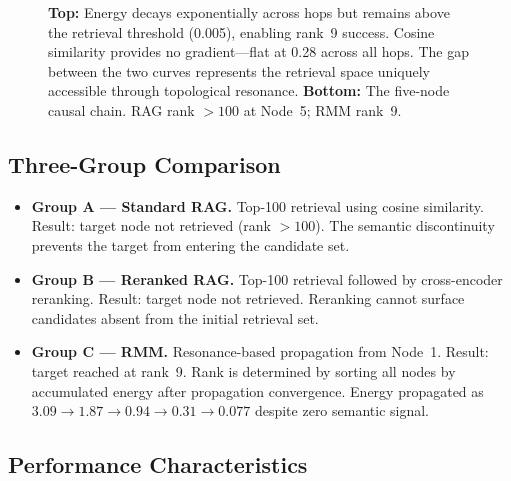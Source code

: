 \documentclass[11pt]{article}
\begin{document}
\begin{figure}[t]

\caption{
  \textbf{Top:} Energy decays exponentially across hops but remains
  above the retrieval threshold (0.005), enabling rank~9 success.
  Cosine similarity provides no gradient---flat at 0.28 across all
  hops. The gap between the two curves represents the retrieval space
  uniquely accessible through topological resonance.
  \textbf{Bottom:} The five-node causal chain. RAG rank $>100$ at
  Node~5; RMM rank~9.
}
\label{fig:energy}
\end{figure}

\subsection{Three-Group Comparison}

\begin{itemize}
  \item \textbf{Group A --- Standard RAG.} Top-100 retrieval using
        cosine similarity. Result: target node not retrieved (rank
        $> 100$). The semantic discontinuity prevents the target from
        entering the candidate set.
  \item \textbf{Group B --- Reranked RAG.} Top-100 retrieval followed
        by cross-encoder reranking. Result: target node not retrieved.
        Reranking cannot surface candidates absent from the initial
        retrieval set.
  \item \textbf{Group C --- RMM.} Resonance-based propagation from
        Node~1. Result: target reached at rank~9. Rank is determined by
        sorting all nodes by accumulated energy after propagation
        convergence. Energy propagated as
        $3.09 \to 1.87 \to 0.94 \to 0.31 \to 0.077$ despite zero
        semantic signal.
\end{itemize}

\subsection{Performance Characteristics}
\end{document}
